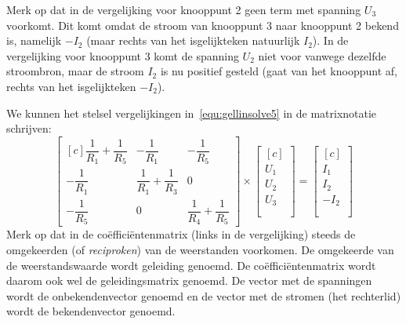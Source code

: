 %
Merk op dat in de vergelijking voor knooppunt 2 geen term met spanning $U_3$ voorkomt. Dit komt omdat de stroom van knooppunt 3 naar knooppunt 2 bekend is, namelijk $-I_2$ (maar rechts van het isgelijkteken natuurlijk $I_2$). In de vergelijking voor knooppunt 3 komt de spanning $U_2$ niet voor vanwege dezelfde stroombron, maar de stroom $I_2$ is nu positief gesteld (gaat van het knooppunt af, rechts van het isgelijkteken $-I_2$).

We kunnen het stelsel vergelijkingen in~\eqref{equ:gellinsolve5} in de matrixnotatie schrijven:
%
\begin{equation}\label{equ:gelmatrixnotatie1}
\begin{bmatrix*}[c]
\dfrac{1}{R_1}+\dfrac{1}{R_5} & -\dfrac{1}{R_1} &  -\dfrac{1}{R_5} \\[1em]
-\dfrac{1}{R_1} & \dfrac{1}{R_1}+\dfrac{1}{R_3} & 0 \\[1em]
-\dfrac{1}{R_5} & 0 & \dfrac{1}{R_4}+\dfrac{1}{R_5}
\end{bmatrix*} \times
\begin{bmatrix*}[c]
\\[-0.3em] U_1 \\[1em] U_2 \\[1em] U_3 \\ \\[-0.3em]
\end{bmatrix*} = 
\begin{bmatrix*}[c]
\\[-0.3em] I_1 \\[1em] I_2\\[1em] -I_2 \\ \\[-0.3em]
\end{bmatrix*}
\end{equation}
%
Merk op dat in de coëfficiëntenmatrix (links in de vergelijking) steeds de omgekeerden (of \textsl{reciproken}) van de weerstanden voorkomen. De omgekeerde van de weerstandswaarde wordt geleiding genoemd. De coëfficiëntenmatrix wordt daarom ook wel de geleidingsmatrix genoemd. De vector met de spanningen wordt de onbekendenvector genoemd en de vector met de stromen (het rechterlid) wordt de bekendenvector genoemd.


